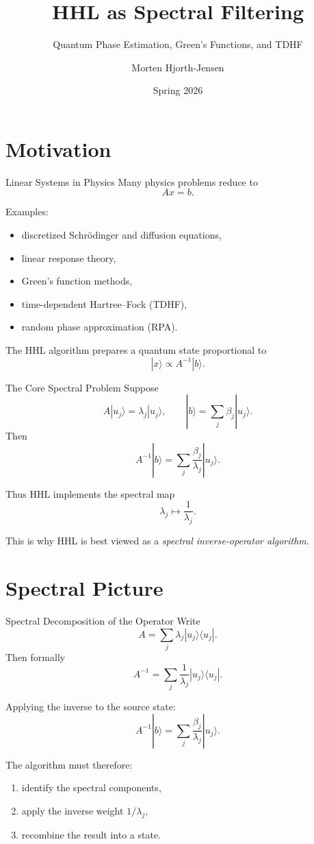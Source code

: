 \documentclass{beamer}
\title{HHL as Spectral Filtering}
\subtitle{Quantum Phase Estimation, Green's Functions, and TDHF}
\author{Morten Hjorth-Jensen}
\date{Spring 2026}
\begin{document}
\frame{\titlepage}

\section{Motivation}

\begin{frame}{Linear Systems in Physics}
Many physics problems reduce to
\[
A x = b.
\]

Examples:
\begin{itemize}
\item discretized Schr\"odinger and diffusion equations,
\item linear response theory,
\item Green's function methods,
\item time-dependent Hartree--Fock (TDHF),
\item random phase approximation (RPA).
\end{itemize}

The HHL algorithm prepares a quantum state proportional to
\[
|x\rangle \propto A^{-1}|b\rangle.
\]
\end{frame}


\begin{frame}{The Core Spectral Problem}
Suppose
\[
A|u_j\rangle = \lambda_j |u_j\rangle,
\qquad
|b\rangle = \sum_j \beta_j |u_j\rangle.
\]
Then
\[
A^{-1}|b\rangle
=
\sum_j \frac{\beta_j}{\lambda_j}|u_j\rangle.
\]

Thus HHL implements the spectral map
\[
\lambda_j \mapsto \frac{1}{\lambda_j}.
\]

This is why HHL is best viewed as a \emph{spectral inverse-operator algorithm}.
\end{frame}

\section{Spectral Picture}

\begin{frame}{Spectral Decomposition of the Operator}
Write
\[
A = \sum_j \lambda_j |u_j\rangle\langle u_j|.
\]
Then formally
\[
A^{-1} = \sum_j \frac{1}{\lambda_j}|u_j\rangle\langle u_j|.
\]

Applying the inverse to the source state:
\[
A^{-1}|b\rangle
=
\sum_j \frac{\beta_j}{\lambda_j}|u_j\rangle.
\]

The algorithm must therefore:
\begin{enumerate}
\item identify the spectral components,
\item apply the inverse weight \(1/\lambda_j\),
\item recombine the result into a state.
\end{enumerate}
\end{frame}
\end{document}
